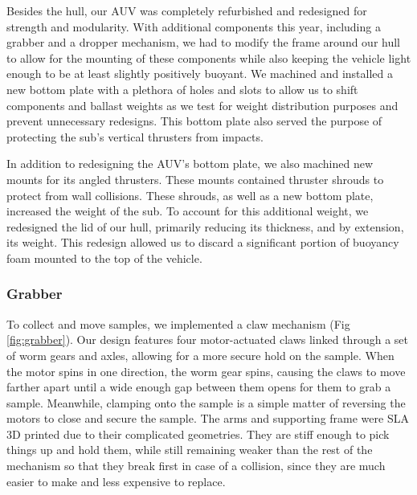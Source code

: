 \documentclass[conference]{IEEEtran}
\begin{document}
Besides the hull, our AUV was completely refurbished and redesigned for strength and modularity. With additional components this year, including a grabber and a dropper mechanism, we had to modify the frame around our hull to allow for the mounting of these components while also keeping the vehicle light enough to be at least slightly positively buoyant. We machined and installed a new bottom plate with a plethora of holes and slots to allow us to shift components and ballast weights as we test for weight distribution purposes and prevent unnecessary redesigns. This bottom plate also served the purpose of protecting the sub’s vertical thrusters from impacts. 

In addition to redesigning the AUV’s bottom plate, we also machined new mounts for its angled thrusters. These mounts contained thruster shrouds to protect from wall collisions. These shrouds, as well as a new bottom plate, increased the weight of the sub. To account for this additional weight, we redesigned the lid of our hull, primarily reducing its thickness, and by extension, its weight. This redesign allowed us to discard a significant portion of buoyancy foam mounted to the top of the vehicle. 


\subsubsection{Grabber}
\label{sssec:grabber}
To collect and move samples, we implemented a claw mechanism (Fig \ref{fig:grabber}). Our design features four motor-actuated claws linked through a set of worm gears and axles, allowing for a more secure hold on the sample. When the motor spins in one direction, the worm gear spins, causing the claws to move farther apart until a wide enough gap between them opens for them to grab a sample. Meanwhile, clamping onto the sample is a simple matter of reversing the motors to close and secure the sample. The arms and supporting frame were SLA 3D printed due to their complicated geometries. They are stiff enough to pick things up and hold them, while still remaining weaker than the rest of the mechanism so that they break first in case of a collision, since they are much easier to make and less expensive to replace.
\end{document}
